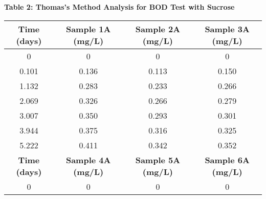 \begin{center}
{\large {\bf Table 2: Thomas's Method Analysis for BOD Test with Sucrose\\}}
\vspace{2mm}
\begin{tabular}{|cccc|} 
    \hline
    \textbf{Time (days)}                      & \textbf{Sample 1A (mg/L)}                     & \textbf{Sample 2A (mg/L)}                     & \textbf{Sample 3A (mg/L)}                       \\ 
    \hline
    0                                         & 0                                             & 0                                             & 0                                               \\
    0.101                                & 0.136                                         & 0.113                                         & 0.150                                           \\
    1.132                                 & 0.283                                         & 0.233                                         & 0.266                                           \\
    2.069                                 & 0.326                                         & 0.266                                         & 0.279                                           \\
    3.007                                 & 0.350                                         & 0.293                                         & 0.301                                           \\
    3.944                                  & 0.375                                         & 0.316                                         & 0.325                                           \\
    5.222                                 & 0.411                                         & 0.342                                         & 0.352                                           \\ 
    \hline\hline
    \textbf{Time (days)} & \textbf{Sample 4A (mg/L)} & \textbf{Sample 5A (mg/L)} & \textbf{Sample 6A (mg/L)}  \\ 
    \hline
    0                                         & 0                                             & 0                                             & 0                                               \\

\end{tabular}
\end{center}
